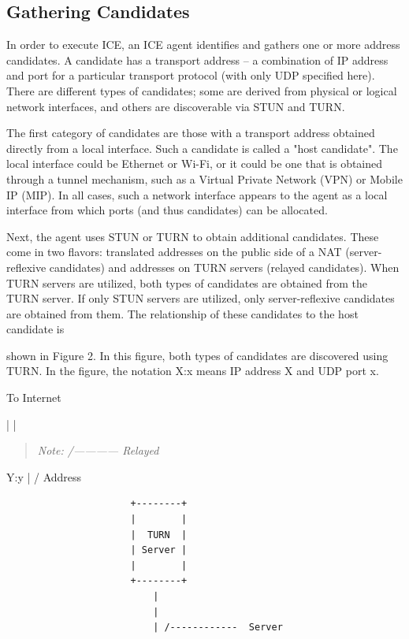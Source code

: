 \documentclass{article}
\begin{document}
\subsection{Gathering Candidates}

In order to execute ICE, an ICE agent identifies and gathers one or more address candidates.  A candidate has a transport address -- a combination of IP address and port for a particular transport protocol (with only UDP specified here).  There are different types of candidates; some are derived from physical or logical network interfaces, and others are discoverable via STUN and TURN.

The first category of candidates are those with a transport address obtained directly from a local interface.  Such a candidate is called a "host candidate".  The local interface could be Ethernet or Wi-Fi, or it could be one that is obtained through a tunnel mechanism, such as a Virtual Private Network (VPN) or Mobile IP (MIP).  In all cases, such a network interface appears to the agent as a local interface from which ports (and thus candidates) can be allocated.

Next, the agent uses STUN or TURN to obtain additional candidates. These come in two flavors: translated addresses on the public side of a NAT (server-reflexive candidates) and addresses on TURN servers (relayed candidates).  When TURN servers are utilized, both types of candidates are obtained from the TURN server.  If only STUN servers are utilized, only server-reflexive candidates are obtained from them.  The relationship of these candidates to the host candidate is

shown in Figure 2.  In this figure, both types of candidates are discovered using TURN.  In the figure, the notation X:x means IP address X and UDP port x.

To Internet

| |

\begin{quote}
\textit{Note: /------------  Relayed}
\end{quote}

Y:y | /               Address

\begin{verbatim}
                      +--------+
                      |        |
                      |  TURN  |
                      | Server |
                      |        |
                      +--------+
                          |
                          |
                          | /------------  Server
\end{verbatim}
\end{document}
